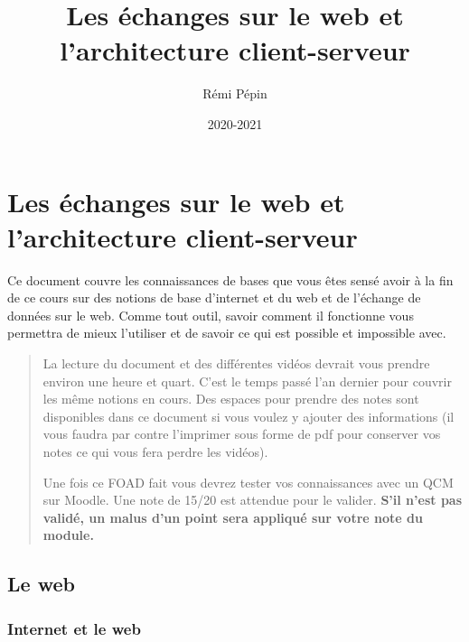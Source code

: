 \documentclass[a4paper]{article}
\title{Les échanges sur le web et l'architecture client-serveur}
\date{2020-2021}
\author{Rémi Pépin}
\begin{document}
\maketitle

\hypertarget{header-n0}{%
\section{Les échanges sur le web et l'architecture
client-serveur}\label{header-n0}}

Ce document couvre les connaissances de bases que vous êtes sensé avoir
à la fin de ce cours sur des notions de base d'internet et du web et de
l'échange de données sur le web. Comme tout outil, savoir comment il
fonctionne vous permettra de mieux l'utiliser et de savoir ce qui est
possible et impossible avec.


\begin{quote}
 La lecture du document et des différentes vidéos devrait vous prendre
environ une heure et quart. C'est le temps passé l'an dernier pour
couvrir les même notions en cours. Des espaces pour prendre des notes
sont disponibles dans ce document si vous voulez y ajouter des
informations (il vous faudra par contre l'imprimer sous forme de pdf
pour conserver vos notes ce qui vous fera perdre les vidéos).

Une fois ce FOAD fait vous devrez tester vos connaissances avec un QCM
sur Moodle. Une note de 15/20 est attendue pour le valider. \textbf{S'il
n'est pas validé, un malus d'un point sera appliqué sur votre note du
module.}
\end{quote}

\hypertarget{header-n6}{%
\subsection{Le web}\label{header-n6}}

\hypertarget{header-n7}{%
\subsubsection{Internet et le web}\label{header-n7}}
\end{document}
